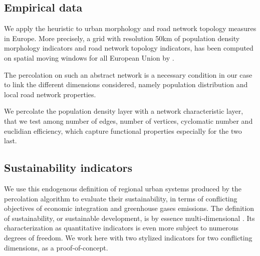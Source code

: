 \documentclass{jimis-en}
\begin{document}
\subsection{Empirical data}


We apply the heuristic to urban morphology and road network topology measures in Europe. More precisely, a grid with resolution 50km of population density morphology indicators and road network topology indicators, has been computed on spatial moving windows for all European Union by \cite{raimbault2018urban}.

The percolation on such an abstract network is a necessary condition in our case to link the different dimensions considered, namely population distribution and local road network properties.

We percolate the population density layer with a network characteristic layer, that we test among number of edges, number of vertices, cyclomatic number and euclidian efficiency, which capture functional properties especially for the two last.






\subsection{Sustainability indicators}


We use this endogenous definition of regional urban systems produced by the percolation algorithm to evaluate their sustainability, in terms of conflicting objectives of economic integration and greenhouse gases emissions. The definition of sustainability, or sustainable development, is by essence multi-dimensional \citep{viguie2012trade}. Its characterization as quantitative indicators is even more subject to numerous degrees of freedom. We work here with two stylized indicators for two conflicting dimensions, as a proof-of-concept.
\end{document}
